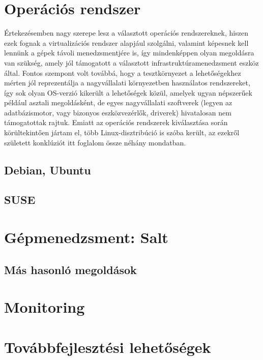 \section{Operációs rendszer}
Értekezésemben nagy szerepe lesz a választott operációs rendszereknek, hiszen ezek fognak a virtualizációs rendszer alapjául szolgálni, valamint képesnek kell lennünk a gépek távoli menedzsmentjére is, így mindenképpen olyan megoldásra van szükség, amely jól támogatott a választott infrastruktúramenedzsment eszköz által. Fontos szempont volt továbbá, hogy a tesztkörnyezet a lehetőségekhez mérten jól reprezentálja a nagyvállalati környezetben használatos rendszereket, így sok olyan OS-verzió kikerült a lehetőségek közül, amelyek ugyan népszerűek például asztali megoldásként, de egyes nagyvállalati szoftverek (legyen az adatbázismotor, vagy bizonyos eszközvezérlők, driverek) hivatalosan nem támogatottak rajtuk. Emiatt az operációs rendszerek kiválasztása során körültekintően jártam el, több Linux-disztribúció is szóba került, az ezekről született konklúziót itt foglalom össze néhány mondatban.

\subsection{Debian, Ubuntu}
\subsection{SUSE} %

\section{Gépmenedzsment: Salt}
\subsection{Más hasonló megoldások}

\section{Monitoring}

\section{Továbbfejlesztési lehetőségek}